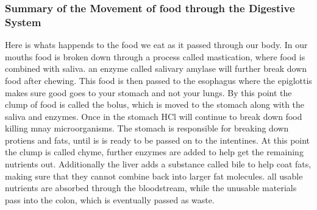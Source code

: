 \documentclass[letterpaper, 11pt]{article}
\begin{document}
\subsubsection{Summary of the Movement of food through the Digestive System}
\label{sec:orgf616642}
Here is whats happends to the food we eat as it passed through our body. In our mouths food is broken down through a process called mastication, where food is combined with saliva. an enzyme called salivary amylase will further break down food after chewing. This food is then passed to the esophagus where the epiglottis makes sure good goes to your stomach and not your lungs. By this point the clump of food is called the bolus, which is moved to the stomach along with the saliva and enzymes. Once in the stomach HCl will continue to break down food killing mnay microorganisms. The stomach is responsible for breaking down protiens and fats, until is is ready to be passed on to the intentines. At this point the clump is called chyme, further enzymes are added to help get the remaining nutrients out. Additionally the liver adds a substance called bile to help coat fats, making sure that they cannot combine back into larger fat molecules. all usable nutrients are absorbed through the bloodstream, while the unusable materials pass into the colon, which is eventually passed as waste.\\
\end{document}
